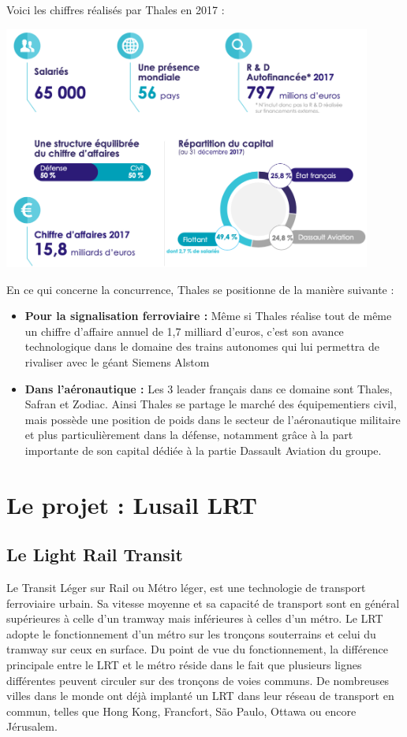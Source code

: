 Voici les chiffres réalisés par Thales en 2017 :

\begin{center}
\includegraphics[height=8cm]{ressources/images/figures/Key.png}
\end{center}

En ce qui concerne la concurrence, Thales se positionne de la manière suivante : 
\begin{itemize}
\item \textbf{Pour la signalisation ferroviaire :} Même si Thales réalise tout de même un chiffre d'affaire annuel de 1,7 milliard d'euros, c'est son avance technologique dans le domaine des trains autonomes qui lui permettra de rivaliser avec le géant Siemens Alstom 
\item \textbf{Dans l'aéronautique :} Les 3 leader français dans ce domaine sont Thales, Safran et Zodiac. Ainsi Thales se partage le marché des équipementiers civil, mais possède une position de poids dans le secteur de l'aéronautique militaire et plus particulièrement dans la défense, notamment grâce à la part importante de son capital dédiée à la partie Dassault Aviation du groupe.
\end{itemize}

\section{Le projet : Lusail LRT}
\subsection{Le Light Rail Transit} Le Transit Léger sur Rail ou Métro léger, est une technologie de transport ferroviaire urbain. Sa vitesse moyenne et sa capacité de transport sont en général supérieures à celle d'un tramway mais inférieures à celles d'un métro. Le \gls{LRT} adopte le fonctionnement d'un métro sur les tronçons souterrains et celui du tramway sur ceux en surface.
Du point de vue du fonctionnement, la différence principale entre le \gls{LRT} et le métro réside dans le fait que plusieurs lignes différentes peuvent circuler sur des tronçons de voies communs. 
De nombreuses villes dans le monde ont déjà implanté un  \gls{LRT} dans leur réseau de transport en commun, telles que Hong Kong, Francfort, São Paulo, Ottawa ou encore Jérusalem.


